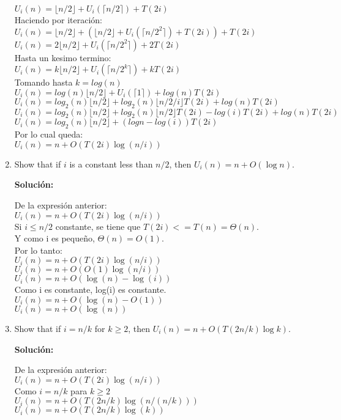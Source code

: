 \documentclass{article}
\begin{document}
\begin{enumerate}[label=\textbf{\alph*.}]
  $U_i(n) = \lfloor n/2 \rfloor + U_i(\lceil n/2\rceil) + T(2i)$\\
  Haciendo por iteración:\\
  $U_i(n) = \lfloor n/2 \rfloor + (\lfloor n/2 \rfloor +  U_i(\lceil n/2^2 \rceil)  + T(2i)) + T(2i)$\\
  $U_i(n) = 2\lfloor n/2 \rfloor + U_i(\lceil n/2^2 \rceil) + 2T(2i)$\\
  Hasta un kesimo termino:\\
  $U_i(n) = k\lfloor n/2 \rfloor + U_i(\lceil n/2^k \rceil) + kT(2i)$\\
  Tomando hasta $k=log(n)$\\
  $U_i(n) = log(n)\lfloor n/2 \rfloor + U_i(\lceil 1 \rceil) + log(n)T(2i)$\\
  $U_i(n) = log_2(n)\lfloor n/2 \rfloor + log_2(n)\lfloor n/2/i \rfloor T(2i) + log(n)T(2i) $\\
  $U_i(n) = log_2(n)\lfloor n/2 \rfloor + log_2(n)\lfloor n/2 \rfloor T(2i)- log(i)T(2i) + log(n)T(2i) $\\
  $U_i(n) = log_2(n)\lfloor n/2 \rfloor + (logn - log(i))T(2i)$\\
  Por lo cual queda:\\
  $U_i(n) = n + O(T(2i)\log(n/i))$\\
  
  \item Show that if $i$ is a constant less than $n/2$, then $U_i(n)=n+O(\log n)$.
  
  \textbf{Solución:}
  
  De la expresión anterior:\\
  $U_i(n) = n + O(T(2i)\log(n/i))$\\
  Si $i\leq n/2$ constante, se tiene que $T(2i) <= T(n) = \Theta (n)$.\\
  Y como i es pequeño, $\Theta (n) = O(1)$.\\
  Por lo tanto:\\
  $U_i(n) = n + O(T(2i)\log(n/i))$\\
  $U_i(n) = n + O(O(1)\log(n/i))$\\
  $U_i(n) = n + O(\log(n)-\log(i))$\\
  Como i es constante, log(i) es constante.\\
  $U_i(n) = n + O(\log(n)-O(1))$\\
  $U_i(n) = n + O(\log(n))$\\
  
  \item Show that if $i =n/k$ for $k\geq 2$, then $U_i(n) = n + O(T(2n/k) \log k)$.
  
  \textbf{Solución:}
  
  De la expresión anterior:\\
  $U_i(n) = n + O(T(2i)\log(n/i))$\\
  Como $i =n/k$ para $k\geq 2$\\
  $U_i(n) = n + O(T(2n/k)\log(n/(n/k)))$\\
  $U_i(n) = n + O(T(2n/k)\log(k))$\\
  
  
\end{enumerate}
\end{document}
